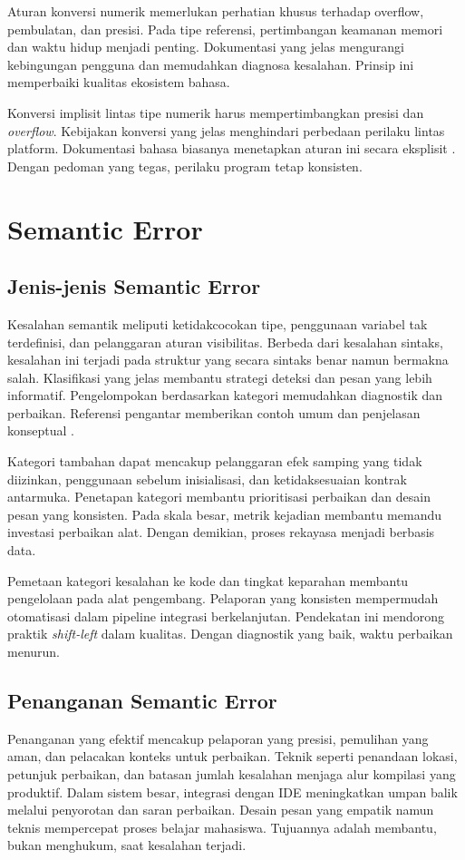 \documentclass[../main.tex]{subfiles}
\begin{document}
Aturan konversi numerik memerlukan perhatian khusus terhadap overflow, pembulatan, dan presisi. Pada tipe referensi, pertimbangan keamanan memori dan waktu hidup menjadi penting. Dokumentasi yang jelas mengurangi kebingungan pengguna dan memudahkan diagnosa kesalahan. Prinsip ini memperbaiki kualitas ekosistem bahasa.

Konversi implisit lintas tipe numerik harus mempertimbangkan presisi dan \emph{overflow}. Kebijakan konversi yang jelas menghindari perbedaan perilaku lintas platform. Dokumentasi bahasa biasanya menetapkan aturan ini secara eksplisit \citep{WikiCoercion}. Dengan pedoman yang tegas, perilaku program tetap konsisten.

\section{Semantic Error}
\subsection{Jenis-jenis Semantic Error}
Kesalahan semantik meliputi ketidakcocokan tipe, penggunaan variabel tak terdefinisi, dan pelanggaran aturan visibilitas. Berbeda dari kesalahan sintaks, kesalahan ini terjadi pada struktur yang secara sintaks benar namun bermakna salah. Klasifikasi yang jelas membantu strategi deteksi dan pesan yang lebih informatif. Pengelompokan berdasarkan kategori memudahkan diagnostik dan perbaikan. Referensi pengantar memberikan contoh umum dan penjelasan konseptual \citep{WikiSemanticError}.

Kategori tambahan dapat mencakup pelanggaran efek samping yang tidak diizinkan, penggunaan sebelum inisialisasi, dan ketidaksesuaian kontrak antarmuka. Penetapan kategori membantu prioritisasi perbaikan dan desain pesan yang konsisten. Pada skala besar, metrik kejadian membantu memandu investasi perbaikan alat. Dengan demikian, proses rekayasa menjadi berbasis data.

Pemetaan kategori kesalahan ke kode dan tingkat keparahan membantu pengelolaan pada alat pengembang. Pelaporan yang konsisten mempermudah otomatisasi dalam pipeline integrasi berkelanjutan. Pendekatan ini mendorong praktik \emph{shift-left} dalam kualitas. Dengan diagnostik yang baik, waktu perbaikan menurun.

\subsection{Penanganan Semantic Error}
Penanganan yang efektif mencakup pelaporan yang presisi, pemulihan yang aman, dan pelacakan konteks untuk perbaikan. Teknik seperti penandaan lokasi, petunjuk perbaikan, dan batasan jumlah kesalahan menjaga alur kompilasi yang produktif. Dalam sistem besar, integrasi dengan IDE meningkatkan umpan balik melalui penyorotan dan saran perbaikan. Desain pesan yang empatik namun teknis mempercepat proses belajar mahasiswa. Tujuannya adalah membantu, bukan menghukum, saat kesalahan terjadi.
\end{document}
